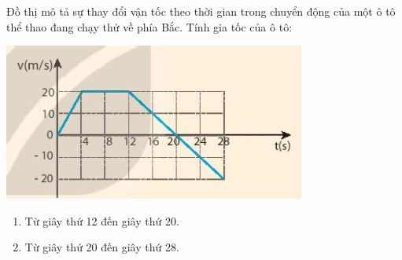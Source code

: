 \begin{enumerate}[label=\bfseries Câu \arabic*:]
{		Đồ thị mô tả sự thay đổi vận tốc theo thời gian trong chuyển động của một ô tô thể thao đang chạy thử về phía Bắc. Tính gia tốc của ô tô:
		\begin{center}
			\includegraphics[scale=1]{../figs/VN10-2022-PH-TP007-3.jpg}
		\end{center}
		
		\begin{enumerate}[label=\alph*)]
			\item Từ giây thứ 12 đến giây thứ 20.
			\item Từ giây thứ 20 đến giây thứ 28.
		\end{enumerate}
	}
\end{enumerate}